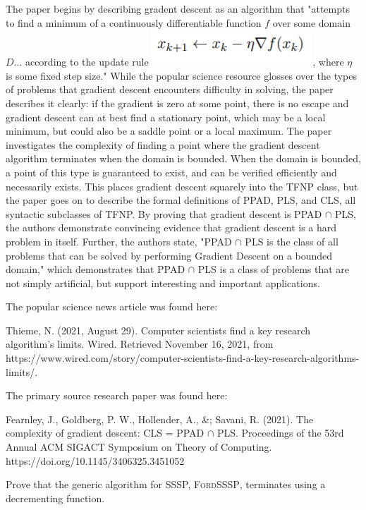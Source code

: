 \documentclass{article}
\begin{document}
The paper begins by describing gradent descent as an algorithm that "attempts to find a minimum of a continuously differentiable function $f$ over some domain $D$... according to the update rule \includegraphics{gradient descent.png}, where $\eta$ is some fixed step size." While the popular science resource glosses over the types of problems that gradient descent encounters difficulty in solving, the paper describes it clearly: if the gradient is zero at some point, there is no escape and gradient descent can at best find a stationary point, which may be a local minimum, but could also be a saddle point or a local maximum. The paper investigates the complexity of finding a point where the gradient descent algorithm terminates when the domain is bounded. When the domain is bounded, a point of this type is guaranteed to exist, and can be verified efficiently and necessarily exists. This places gradient descent squarely into the TFNP class, but the paper goes on to describe the formal definitions of PPAD, PLS, and CLS, all syntactic subclasses of TFNP. By proving that gradient descent is PPAD $\cap$ PLS, the authors demonstrate convincing evidence that gradient descent is a hard problem in itself. Further, the authors state, "PPAD $\cap$ PLS is the class of all problems that can be solved by performing Gradient Descent on a bounded domain," which demonstrates that PPAD $\cap$ PLS is a class of problems that are not simply artificial, but support interesting and important applications.

The popular science news article was found here: 

Thieme, N. (2021, August 29). Computer scientists find a key research algorithm's limits. Wired. Retrieved November 16, 2021, from https://www.wired.com/story/computer-scientists-find-a-key-research-algorithms-limits/. 

The primary source research paper was found here:  

Fearnley, J., Goldberg, P. W., Hollender, A., \&; Savani, R. (2021). The complexity of gradient descent: CLS = PPAD $\cap$ PLS. Proceedings of the 53rd Annual ACM SIGACT Symposium on Theory of Computing. https://doi.org/10.1145/3406325.3451052 


Prove that the generic algorithm for SSSP, \textsc{FordSSSP}, terminates using a
decrementing function.
\end{document}

